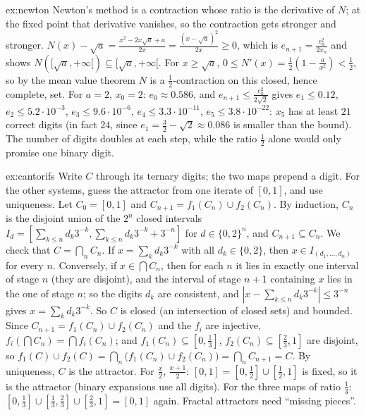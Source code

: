 \begin{solution}{ex:newton}
\idea Newton's method is a contraction whose ratio is the derivative of $N$; at the fixed point that derivative vanishes, so the
contraction gets stronger and stronger.
\writeup $N(x)-\sqrt a=\frac{x^2-2x\sqrt a+a}{2x}=\frac{(x-\sqrt a)^2}{2x}\ge0$, which is $e_{n+1}=\frac{e_n^2}{2x_n}$ and shows $N([\sqrt a,+\infty[)\subseteq[\sqrt a,+\infty[$. For $x\ge\sqrt a$,
$0\le N'(x)=\frac12(1-\frac a{x^2})<\frac12$, so by the mean value theorem $N$ is a $\frac12$-contraction on this closed, hence complete, set. For $a=2$, $x_0=2$:
$e_0\approx0.586$, and $e_{n+1}\le\frac{e_n^2}{2\sqrt2}$ gives $e_1\le0.12$, $e_2\le5.2\cdot10^{-3}$, $e_3\le9.6\cdot10^{-6}$, $e_4\le3.3\cdot10^{-11}$, $e_5\le3.8\cdot10^{-22}$: $x_5$ has
at least $21$ correct digits (in fact $24$, since $e_1=\frac32-\sqrt2\approx0.086$ is smaller than the bound). The number of digits doubles at each step, while the ratio $\frac12$ alone would only promise one binary digit.
\end{solution}

\begin{solution}{ex:cantorifs}
\idea Write $C$ through its ternary digits; the two maps prepend a digit. For the other systems, guess the attractor from one iterate of
$[0,1]$, and use uniqueness.
\writeup Let $C_0=[0,1]$ and $C_{n+1}=f_1(C_n)\cup f_2(C_n)$. By induction, $C_n$ is the disjoint union of the $2^n$ closed intervals
$I_{d}=[\sum_{k\le n}d_k3^{-k},\sum_{k\le n}d_k3^{-k}+3^{-n}]$ for $d\in\{0,2\}^n$, and $C_{n+1}\subseteq C_n$. We check that $C=\bigcap_nC_n$. If $x=\sum_kd_k3^{-k}$ with all $d_k\in\{0,2\}$,
then $x\in I_{(d_1,\dots,d_n)}$ for every $n$. Conversely, if $x\in\bigcap C_n$, then for each $n$ it lies in exactly one interval of stage $n$ (they are
disjoint), and the interval of stage $n+1$ containing $x$ lies in the one of stage $n$; so the digits $d_k$ are consistent, and $|x-\sum_{k\le n}d_k3^{-k}|\le3^{-n}$
gives $x=\sum_kd_k3^{-k}$. So $C$ is closed (an intersection of closed sets) and bounded. Since $C_{n+1}=f_1(C_n)\cup f_2(C_n)$ and the
$f_i$ are injective, $f_i(\bigcap C_n)=\bigcap f_i(C_n)$; and $f_1(C_n)\subseteq[0,\frac13]$, $f_2(C_n)\subseteq[\frac23,1]$ are disjoint, so
$f_1(C)\cup f_2(C)=\bigcap_n\bigl(f_1(C_n)\cup f_2(C_n)\bigr)=\bigcap_nC_{n+1}=C$. By uniqueness, $C$ is the attractor.
For $\frac x2$, $\frac{x+1}2$: $[0,1]=[0,\frac12]\cup[\frac12,1]$ is fixed, so it is the attractor (binary expansions use all digits). For the three maps of ratio
$\frac13$: $[0,\frac13]\cup[\frac13,\frac23]\cup[\frac23,1]=[0,1]$ again. Fractal attractors need ``missing pieces''.
\end{solution}

